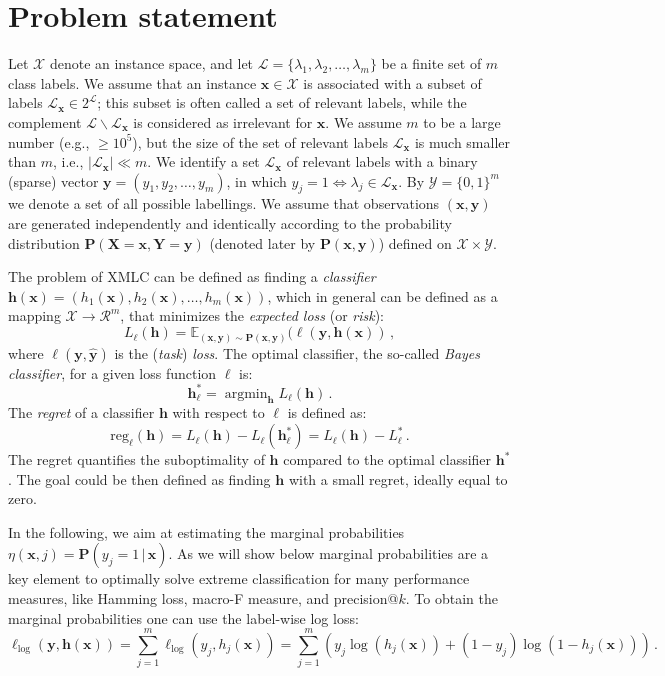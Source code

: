 \documentclass{article}
\renewcommand{\vec}[1]{\boldsymbol{#1}}
\newcommand{\bx}{\vec{x}}
\newcommand{\by}{\vec{y}}
\newcommand{\bh}{\vec{h}}
\newcommand{\bX}{\vec{X}}
\newcommand{\bY}{\vec{Y}}
\newcommand{\calX}{\mathcal{X}}
\newcommand{\calY}{\mathcal{Y}}
\newcommand{\calL}{\mathcal{L}}
\newcommand{\calR}{\mathcal{R}}
\newcommand{\prob}{\mathbf{P}}
\newcommand{\reg}{\mathrm{reg}}
\newcommand{\loss}{L}
\newcommand{\given}{\, | \,}
\DeclareMathOperator*{\argmin}{\arg \min}
\newcommand{\sectionBefore}{-0pt}
\newcommand{\sectionAfter}{-0pt}
\begin{document}
\vspace{\sectionBefore}
\section{Problem statement}
\label{sec:problem_statement}
\vspace{\sectionAfter}

Let $\calX$ denote an instance space, and let $\calL = \{\lambda_1,\lambda_2, \ldots,\lambda_m\}$ be a finite set of $m$ class labels. 
We assume that an instance $\bx \in \calX$ is associated with a subset of
labels $\calL_{\bx} \in 2^\calL$; this subset is often called a set of relevant labels, while the complement
$\calL \backslash \calL_{\bx}$ is considered as irrelevant for $\bx$. We assume $m$ to be a large number (e.g., $\ge 10^5$), but the size of the set of relevant labels $\calL_{\bx}$ is much smaller than $m$, i.e., $|\calL_{\bx}| \ll m$. We identify a set $\calL_{\bx}$ of relevant labels with a binary (sparse)
vector $\by = (y_1,y_2, \ldots, y_m)$, in which $y_j = 1 \Leftrightarrow \lambda_j \in \calL_{\bx}$. By $\calY = \{0, 1\}^m$ we denote a set of all
possible labellings.
We assume that observations $(\bx, \by)$ are generated independently and identically according to the
probability distribution $\prob(\bX = \bx,\bY = \by)$ (denoted later by $\prob(\bx, \by)$) defined on $\calX \times \calY$. 

The problem of XMLC can be defined as finding a  \emph{classifier} $\bh(\bx) = (h_1(\bx), h_2(\bx),\ldots, h_m(\bx))$, 
which in general can be defined as a mapping $\calX \rightarrow \calR^m$, that minimizes the \emph{expected loss} (or \emph{risk}):  
$$
\loss_\ell(\bh) = \mathbb{E}_{(\bx,\by) \sim \prob(\bx,\by)} (\ell(\by, \bh(\bx))\,,
$$
where $\ell(\by, \hat{\by})$ is the  (\emph{task}) \emph{loss}.
%
The optimal classifier,  the so-called \emph{Bayes classifier},  for a given loss function $\ell$ is:
$$
\bh^*_\ell = \argmin_{\bh}  \loss_\ell(\bh) \,.
$$
The \emph{regret} of a classifier $\bh$ with respect to $\ell$ is defined as:
 $$
\reg_\ell(\bh) = \loss_\ell(\bh) - \loss_\ell(\bh_{\ell}^*) = \loss_\ell(\bh) - \loss_\ell^* \,.
$$
The regret quantifies the suboptimality of $\bh$ compared to the optimal classifier $\bh^*$. The goal could be then defined as finding $\bh$ with a small regret, ideally equal to zero.

In the following, we aim at estimating the marginal probabilities $\eta(\bx,j) = \prob(y_j = 1 \given \bx)$. As we will show below marginal probabilities are a key element to optimally solve extreme classification for many performance measures, like Hamming loss, macro-F measure, and precision@$k$. 
To obtain the marginal probabilities one can use the label-wise log loss:
$$
\ell_{\log}(\by, \bh(\bx))  = \sum_{j=1}^m \ell_{\log}(y_j, h_j(\bx)) = \sum_{j=1}^m  \left ( y_j \log(h_j(\bx)) + (1-y_j) \log(1-h_j(\bx)) \right) \,.
$$
\end{document}
